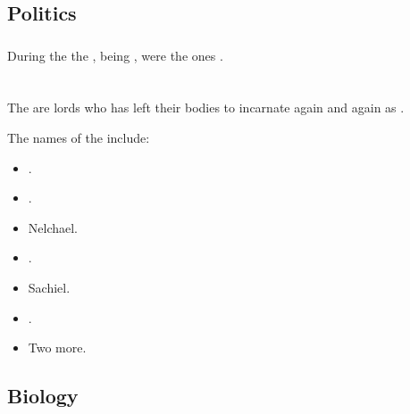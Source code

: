 \subsection{Politics}





\subsubsection{\TiphredSerah}
During the  the \TiphredSerah{}, being , were the ones . 















\section{\Malachim}
The \Malachim{} are \resphan{} lords who has left their \resphan{} bodies to incarnate again and again as \humans{}. 

The names of the \Malachim{} include: 
\begin{itemize}
  \item {}.
  \item {}.
  \item Nelchael.
  \item {}.
  \item Sachiel.
  \item {}.
  \item Two more. 
\end{itemize}










\subsection{Biology}






